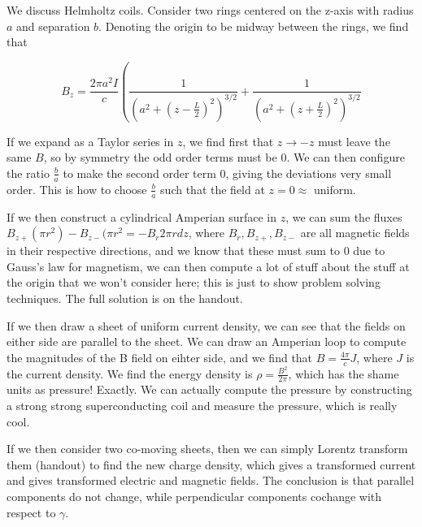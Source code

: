 \documentclass[12pt]{article}
\begin{document}
We discuss Helmholtz coils. Consider two rings centered on the z-axis with radius $a$ and separation $b$. Denoting the origin to be midway between the rings, we find that

$$B_z = \frac{2\pi a^2 I}{c}\left(\frac{1}{(a^2 + (z - \frac{L}{2})^2)^{3/2}} + \frac{1}{(a^2 + (z + \frac{L}{2})^2)^{3/2}}$$

If we expand as a Taylor series in $z$, we find first that $z \to -z$ must leave the same $B$, so by symmetry the odd order terms must be $0$. We can then configure the ratio $\frac{b}{a}$ to make the second order term $0$, giving the deviations very small order. This is how to choose $\frac{b}{a}$ such that the field at $z=0 \approx$ uniform. 

If we then construct a cylindrical Amperian surface in $z$, we can sum the fluxes $B_{z+}(\pi r^2) - B_{z-}(\pi r^2 = -B_r2\pi r dz$, where $B_r, B_{z+}, B_{z-}$ are all magnetic fields in their respective directions, and we know that these must sum to $0$ due to Gauss's law for magnetism, we can then compute a lot of stuff about the stuff at the origin that we won't consider here; this is just to show problem solving techniques. The full solution is on the handout.

If we then draw a sheet of uniform current density, we can see that the fields on either side are parallel to the sheet. We can draw an Amperian loop to compute the magnitudes of the B field on eihter side, and we find that $B = \frac{4\pi}{c}J$, where $J$ is the current density. We find the energy density is $\rho = \frac{B^2}{2\pi}$, which has the shame units as pressure! Exactly. We can actually compute the pressure by constructing a strong strong superconducting coil and measure the pressure, which is really cool. 

If we then consider two co-moving sheets, then we can simply Lorentz transform them (handout) to find the new charge density, which gives a transformed current and gives transformed electric and magnetic fields. The conclusion is that parallel components do not change, while perpendicular components cochange with respect to $\gamma$.
\end{document}
